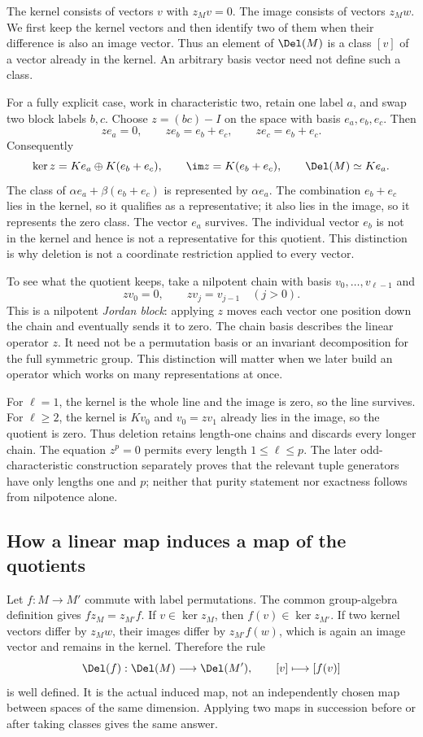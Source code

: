\documentclass[11pt,a4paper,oneside,openany]{book}
\theoremstyle{definition}\newtheorem{definition}[theorem]{Definition}
\theoremstyle{remark}\newtheorem{remark}[theorem]{Remark}
\numberwithin{equation}{chapter}
\begin{document}
The kernel consists of vectors $v$ with $z_Mv=0$. The image
consists of vectors $z_Mw$. We first keep the kernel vectors and
then identify two of them when their difference is also an image
vector. Thus an element of $\Del(M)$ is a class $[v]$ of a vector
already in the kernel. An arbitrary basis vector need not define
such a class.

For a fully explicit case, work in characteristic two, retain one
label $a$, and swap two block labels $b,c$. Choose
$z=(bc)-I$ on the space with basis $e_a,e_b,e_c$. Then
\[
 ze_a=0,\qquad ze_b=e_b+e_c,\qquad ze_c=e_b+e_c.
\]
Consequently
\[
 \ker z=K e_a\oplus K(e_b+e_c),\qquad
 \im z=K(e_b+e_c),\qquad \Del(M)\simeq K e_a.
\]
The class of $\alpha e_a+\beta(e_b+e_c)$ is represented by
$\alpha e_a$. The combination $e_b+e_c$ lies in the kernel,
so it qualifies as a representative; it also lies in the image,
so it represents the zero class.
The vector $e_a$ survives. The individual vector $e_b$ is not in
the kernel and hence is not a representative for this quotient.
This distinction is why deletion is not a coordinate restriction
applied to every vector.

To see what the quotient keeps, take a nilpotent chain with basis
$v_0,\ldots,v_{\ell-1}$ and
\[
                  zv_0=0,\qquad zv_j=v_{j-1}\quad(j>0).
\]
This is a nilpotent \emph{Jordan block}: applying $z$ moves each vector
one position down the chain and eventually sends it to zero.
The chain basis describes the linear operator $z$. It need not be a
permutation basis or an invariant decomposition for the full symmetric
group. This distinction will matter when we later build an operator
which works on many representations at once.

For $\ell=1$, the kernel is the whole line and the image is zero,
so the line survives. For $\ell\ge2$, the kernel is $Kv_0$ and
$v_0=zv_1$ already lies in the image, so the quotient is zero.
Thus deletion retains length-one chains and discards every longer chain.
The equation $z^p=0$ permits every length $1\le\ell\le p$.
The later odd-characteristic construction separately proves that the
relevant tuple generators have only lengths one and $p$; neither that
purity statement nor exactness follows from nilpotence alone.

\subsection*{How a linear map induces a map of the quotients}
Let $f:M\to M'$ commute with label permutations. The common
group-algebra definition gives $f z_M=z_{M'}f$. If $v\in\ker z_M$,
then $f(v)\in\ker z_{M'}$. If two kernel vectors differ by
$z_Mw$, their images differ by $z_{M'}f(w)$, which is again an
image vector and remains in the kernel. Therefore the rule
\[
                  \Del(f):\Del(M)\longrightarrow\Del(M'),
                              \qquad[v]\longmapsto[f(v)]
\]
is well defined. It is the actual induced map, not an independently
chosen map between spaces of the same dimension. Applying two maps
in succession before or after taking classes gives the same answer.
\end{document}
